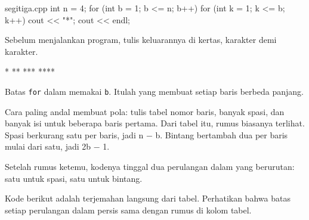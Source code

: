\documentclass[a4paper]{article}
\begin{document}
\begin{MKode}{segitiga.cpp}
int n = 4;
for (int b = 1; b <= n; b++) {
    for (int k = 1; k <= b; k++) {
        cout << "*";
    }
    cout << endl;
}
\end{MKode}
\begin{Tebak}[]
Sebelum menjalankan program, tulis keluarannya di kertas, karakter demi karakter.
\end{Tebak}
\begin{Jawaban}[]
\begin{MKeluaran}[]
*
**
***
****
\end{MKeluaran}
Batas \texttt{for} dalam memakai \texttt{b}. Itulah yang membuat setiap baris berbeda panjang.
\end{Jawaban}
Cara paling andal membuat pola: tulis tabel nomor baris, banyak spasi, dan banyak isi untuk beberapa baris pertama. Dari tabel itu, rumus biasanya terlihat. Spasi berkurang satu per baris, jadi n − b. Bintang bertambah dua per baris mulai dari satu, jadi 2b − 1.

Setelah rumus ketemu, kodenya tinggal dua perulangan dalam yang berurutan: satu untuk spasi, satu untuk bintang.

\par\vspace{4pt}\par\vspace{6pt}
Kode berikut adalah terjemahan langsung dari tabel. Perhatikan bahwa batas setiap perulangan dalam persis sama dengan rumus di kolom tabel.
\end{document}
